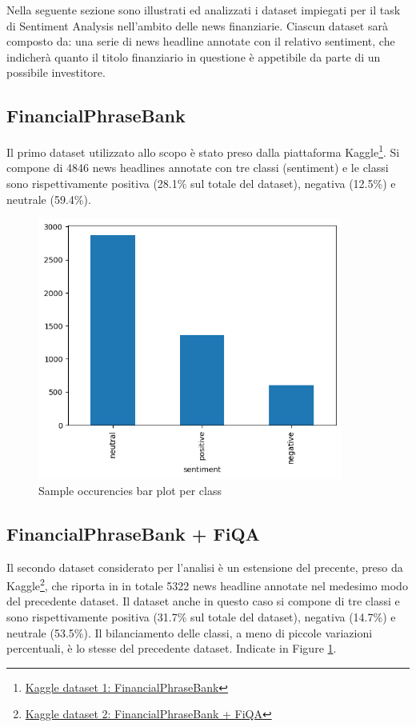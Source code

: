 Nella seguente sezione sono illustrati ed analizzati i dataset impiegati per il task di Sentiment Analysis nell'ambito delle news finanziarie. Ciascun dataset sarà composto da: una serie di news headline annotate con il relativo sentiment, che indicherà quanto il titolo finanziario in questione è appetibile da parte di un possibile investitore.

\subsection{FinancialPhraseBank}
Il primo dataset utilizzato allo scopo è stato preso dalla piattaforma Kaggle\footnote{\href{https://www.kaggle.com/datasets/ankurzing/sentiment-analysis-for-financial-news}{Kaggle dataset 1: FinancialPhraseBank}}. Si compone di 4846 news headlines annotate con tre classi (sentiment) e le classi sono rispettivamente positiva (28.1\% sul totale del dataset), negativa (12.5\%) e neutrale (59.4\%).

\begin{figure}[!ht]
    \centering
    \includegraphics[width=10cm]{./images/dataset_percentage_bar_plot.png}
    \caption{Sample occurencies bar plot per class }
    \label{figure:dataset_perc}
\end{figure}

\subsection{FinancialPhraseBank + FiQA}
Il secondo dataset considerato per l'analisi è un estensione del precente, preso da Kaggle\footnote{\href{https://www.kaggle.com/datasets/sbhatti/financial-sentiment-analysis}{Kaggle dataset 2: FinancialPhraseBank + FiQA}}, che riporta in in totale 5322 news headline annotate nel medesimo modo del precedente dataset. 
Il dataset anche in questo caso si compone di tre classi e sono rispettivamente positiva (31.7\% sul totale del dataset), negativa (14.7\%) e neutrale (53.5\%). Il bilanciamento delle classi, a meno di piccole variazioni percentuali, è lo stesse del precedente dataset. \newline 
Indicate in Figure \ref{figure:dataset_perc}.

\newpage



